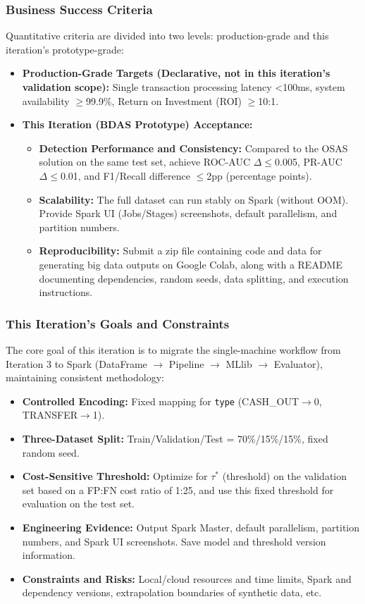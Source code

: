 \documentclass[sigplan,screen]{acmart}
\begin{document}
\subsubsection{Business Success Criteria}
Quantitative criteria are divided into two levels: production-grade and this iteration's prototype-grade:

\begin{itemize}
\item \textbf{Production-Grade Targets (Declarative, not in this iteration's validation scope):} Single transaction processing latency <100ms, system availability $\geq$99.9\%, Return on Investment (ROI) $\geq$10:1.
\item \textbf{This Iteration (BDAS Prototype) Acceptance:}
\begin{itemize}
\item \textbf{Detection Performance and Consistency:} Compared to the OSAS solution on the same test set, achieve ROC-AUC $\Delta\leq$0.005, PR-AUC $\Delta\leq$0.01, and F1/Recall difference $\leq$2pp (percentage points).
\item \textbf{Scalability:} The full dataset can run stably on Spark (without OOM). Provide Spark UI (Jobs/Stages) screenshots, default parallelism, and partition numbers.
\item \textbf{Reproducibility:} Submit a zip file containing code and data for generating big data outputs on Google Colab, along with a README documenting dependencies, random seeds, data splitting, and execution instructions.
\end{itemize}
\end{itemize}

\subsubsection{This Iteration's Goals and Constraints}
The core goal of this iteration is to migrate the single-machine workflow from Iteration 3 to Spark (DataFrame $\rightarrow$ Pipeline $\rightarrow$ MLlib $\rightarrow$ Evaluator), maintaining consistent methodology:

\begin{itemize}
\item \textbf{Controlled Encoding:} Fixed mapping for \texttt{type}\newline
(CASH\_OUT$\rightarrow$0, TRANSFER$\rightarrow$1).
\item \textbf{Three-Dataset Split:} Train/Validation/Test = 70\%/15\%/15\%, fixed random seed.
\item \textbf{Cost-Sensitive Threshold:} Optimize for $\tau^*$ (threshold) on the validation set based on a FP:FN cost ratio of 1:25, and use this fixed threshold for evaluation on the test set.
\item \textbf{Engineering Evidence:} Output Spark Master, default parallelism, partition numbers, and Spark UI screenshots. Save model and threshold version information.
\item \textbf{Constraints and Risks:} Local/cloud resources and time limits, Spark and dependency versions, extrapolation boundaries of synthetic data, etc.
\end{itemize}
\end{document}
